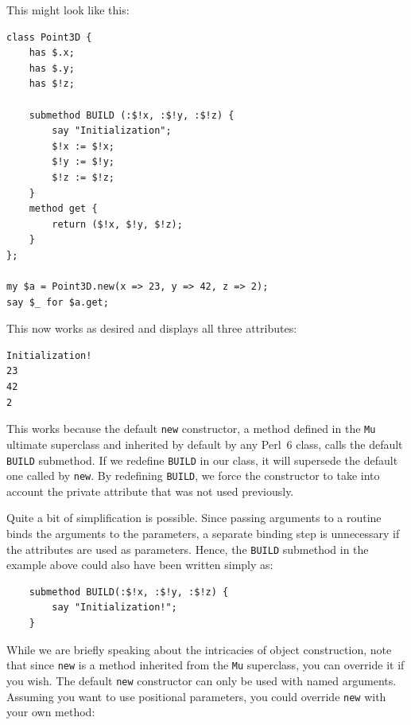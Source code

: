 This might look like this:

\begin{verbatim}
class Point3D {
    has $.x;
    has $.y;
    has $!z;

    submethod BUILD (:$!x, :$!y, :$!z) {
    	say "Initialization";
        $!x := $!x; 
        $!y := $!y; 
        $!z := $!z;
    }
    method get {
        return ($!x, $!y, $!z);
    }
};

my $a = Point3D.new(x => 23, y => 42, z => 2);
say $_ for $a.get;
\end{verbatim}

This now works as desired and displays all three attributes:

\begin{verbatim}
Initialization!
23
42
2
\end{verbatim}

This works because the default {\tt new} constructor, a method 
defined in the {\tt Mu} ultimate superclass and inherited by 
default by any Perl~6 class, calls 
the default {\tt BUILD} submethod. If we redefine {\tt BUILD} 
in our class, it will supersede the default one 
called by {\tt new}. By redefining {\tt BUILD}, we force 
the constructor to take into account the private attribute that 
was not used previously.

Quite a bit of simplification is possible. Since passing arguments 
to a routine binds the arguments to the parameters, a separate 
binding step is unnecessary if the attributes are used as 
parameters. Hence, the {\tt BUILD} submethod in the example 
above could also have been written simply as:

\begin{verbatim}
    submethod BUILD(:$!x, :$!y, :$!z) {
        say "Initialization!";
    }
\end{verbatim}


While we are briefly speaking about the intricacies of object 
construction, note that since {\tt new} is a method inherited 
from the {\tt Mu} superclass, you can override it if you wish. 
The default {\tt new} constructor can only be used with named 
arguments. Assuming you want to use positional parameters, you 
could override {\tt new} with your own method:
 

